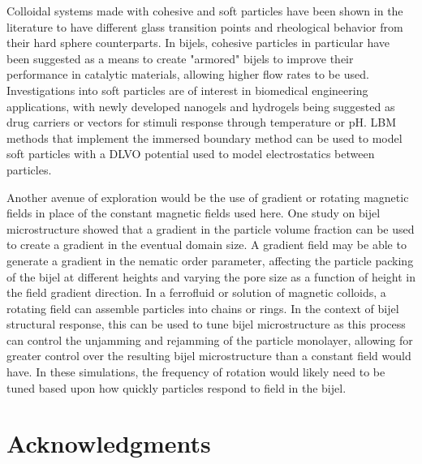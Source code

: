 Colloidal systems made with cohesive and soft particles have been shown in the literature to have different glass 
transition points and rheological behavior from their hard sphere counterparts. In bijels, cohesive particles in 
particular have been suggested as a means to create "armored" bijels to improve their performance in catalytic materials, 
allowing higher flow rates to be used. Investigations into soft particles are of interest in biomedical engineering 
applications, with newly developed nanogels and hydrogels being suggested as drug carriers or vectors for stimuli 
response through temperature or pH. LBM methods that implement the immersed boundary method can be used to model soft
particles with a DLVO potential used to model electrostatics between particles. \cite{silva_lattice_2024}

Another avenue of exploration would be the use of gradient or rotating magnetic fields in place of the constant magnetic 
fields used here. One study on bijel microstructure showed that a gradient in the particle volume fraction can be used to 
create a gradient in the eventual domain size. A gradient field may be able to generate a gradient in the nematic order 
parameter, affecting the particle packing of the bijel at different heights and varying the pore size as a function of 
height in the field gradient direction. In a ferrofluid or solution of magnetic colloids, a rotating field can assemble 
particles into chains or rings. In the context of bijel structural response, this can be used to tune bijel microstructure 
as this process can control the unjamming and rejamming of the particle monolayer, allowing for greater control over the 
resulting bijel microstructure than a constant field would have. In these simulations, the frequency of rotation would 
likely need to be tuned based upon how quickly particles respond to field in the bijel.



\section{Acknowledgments}

